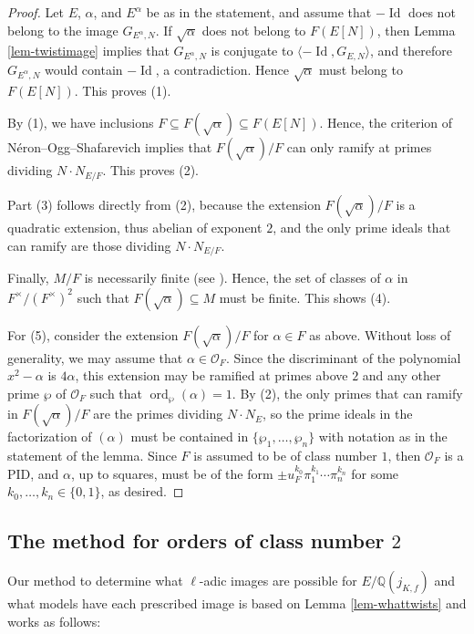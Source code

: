 \documentclass[11pt]{amsart}
\theoremstyle{definition}
\newcommand{\Q}{\mathbb Q}
\newcommand{\OF}{\mathcal{O}_F}
\newcommand{\id}{\operatorname{Id}}
\begin{document}
\begin{proof}
    Let $E$, $\alpha$, and $E^\alpha$ be as in the statement, and assume that $-\id$ does not belong to the image $G_{E^\alpha,N}$. If $\sqrt{\alpha}$ does not belong to $F(E[N])$, then Lemma \ref{lem-twistimage} implies that $G_{E^\alpha,N}$ is conjugate to $\langle -\id, G_{E,N} \rangle$, and therefore $G_{E^\alpha,N}$ would contain $-\id$, a contradiction. Hence $\sqrt{\alpha}$ must belong to $F(E[N])$. This proves (1).

    By (1), we have inclusions $F\subseteq F(\sqrt{\alpha})\subseteq F(E[N])$. Hence, the criterion of N\'eron--Ogg--Shafarevich implies that $F(\sqrt{\alpha})/F$ can only ramify at primes dividing $N\cdot N_{E/F}$. This proves (2).

Part (3) follows directly from (2), because the extension $F(\sqrt{\alpha})/F$ is a quadratic extension, thus abelian of exponent $2$, and the only prime ideals that can ramify are those dividing $N\cdot N_{E/F}$.%

Finally, $M/F$ is necessarily finite (see \cite[Ch. VIII, Prop. 1.6]{silverman1}). Hence, the set of classes of $\alpha$ in $F^\times/(F^\times)^2$ such that $F(\sqrt{\alpha})\subseteq M$ must be finite. This shows (4).

For (5), consider the extension $F(\sqrt{\alpha})/F$ for $\alpha\in F$ as above. Without loss of generality, we may assume that $\alpha \in \OF$. Since the discriminant of the polynomial $x^2-\alpha$ is $4\alpha$, this extension may be ramified at primes above $2$ and any other prime $\wp$ of $\OF$ such that $\operatorname{ord}_\wp(\alpha)=1$. By (2), the only primes that can ramify in $F(\sqrt{\alpha})/F$ are the primes dividing $N\cdot N_E$, so the prime ideals in the factorization of $(\alpha)$ must be contained in $\{\wp_1,\ldots,\wp_n\}$ with notation as in the statement of the lemma. Since $F$ is assumed to be of class number $1$, then $\OF$ is a PID, and $\alpha$, up to squares, must be of the form $\pm u_F^{k_0}\pi_1^{k_1}\cdots \pi_n^{k_n}$ for some $k_0,\ldots,k_n\in\{0,1\}$, as desired.
\end{proof}

\subsection{The method for orders of class number $2$}\label{sec-method} Our method to determine what $\ell$-adic images are possible for $E/\Q(j_{K,f})$ and what models have each prescribed image is based on Lemma \ref{lem-whattwists} and works as follows:
\end{document}
